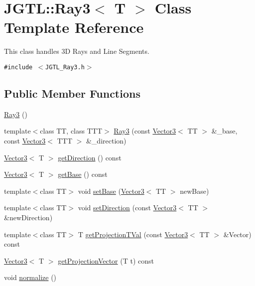 \hypertarget{class_j_g_t_l_1_1_ray3}{
\section{JGTL::Ray3$<$ T $>$ Class Template Reference}
\label{class_j_g_t_l_1_1_ray3}
}
This class handles 3D Rays and Line Segments.  


{\tt \#include $<$JGTL\_\-Ray3.h$>$}

\subsection*{Public Member Functions}
\begin{CompactItemize}
\item 
\hyperlink{class_j_g_t_l_1_1_ray3_4bb85483d586f50f9b322bf93e861da5}{Ray3} ()
\item 
template$<$class TT, class TTT$>$ \hyperlink{class_j_g_t_l_1_1_ray3_1a31f0cc4568493c7de6c9c6571f63c5}{Ray3} (const \hyperlink{class_j_g_t_l_1_1_vector3}{Vector3}$<$ TT $>$ \&\_\-base, const \hyperlink{class_j_g_t_l_1_1_vector3}{Vector3}$<$ TTT $>$ \&\_\-direction)
\item 
\hyperlink{class_j_g_t_l_1_1_vector3}{Vector3}$<$ T $>$ \hyperlink{class_j_g_t_l_1_1_ray3_67bf186dce63bb65f0b5ad105e0d2418}{get\-Direction} () const
\item 
\hyperlink{class_j_g_t_l_1_1_vector3}{Vector3}$<$ T $>$ \hyperlink{class_j_g_t_l_1_1_ray3_2889303af0d3c3aaf7b24b4fb841613c}{get\-Base} () const
\item 
template$<$class TT$>$ void \hyperlink{class_j_g_t_l_1_1_ray3_61e6030f02fd3ba346634c808054962f}{set\-Base} (\hyperlink{class_j_g_t_l_1_1_vector3}{Vector3}$<$ TT $>$ new\-Base)
\item 
template$<$class TT$>$ void \hyperlink{class_j_g_t_l_1_1_ray3_eaa2bcbd6fa914eab2c653e2053ce42b}{set\-Direction} (const \hyperlink{class_j_g_t_l_1_1_vector3}{Vector3}$<$ TT $>$ \&new\-Direction)
\item 
template$<$class TT$>$ T \hyperlink{class_j_g_t_l_1_1_ray3_a82c4c7c60beee84f42dae8329bafebd}{get\-Projection\-TVal} (const \hyperlink{class_j_g_t_l_1_1_vector3}{Vector3}$<$ TT $>$ \&Vector) const 
\item 
\hyperlink{class_j_g_t_l_1_1_vector3}{Vector3}$<$ T $>$ \hyperlink{class_j_g_t_l_1_1_ray3_39b7bca999aefc20548add34db248989}{get\-Projection\-Vector} (T t) const 
\item 
void \hyperlink{class_j_g_t_l_1_1_ray3_939795292a630247cd6d0eb27bd17527}{normalize} ()
\end{CompactItemize}
